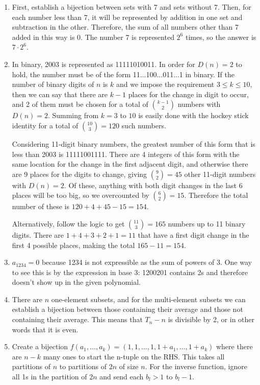 \documentclass{book}
\numberwithin{equation}{section}
\begin{document}
\begin{enumerate}[label={4.\arabic*}]
\item
First, establish a bijection between sets with 7 and sets without 7. Then, for each number less than 7,
it will be represented by addition in one set and subtraction in the other. Therefore, the sum of all numbers
other than 7 added in this way is 0. The number 7 is represented $2^6$ times, so the answer is $7 \cdot 2^6$.

\item
In binary, 2003 is represented as 11111010011. In order for $D(n) = 2$ to hold, the number must be
of the form 11...100...011...1 in binary. If the number of binary digits of $n$ is $k$ and we impose the requirement
$3 \leq k \leq 10$, then we can say that there are $k-1$ places for the change in digit to occur, and 2 of
them must be chosen for a total of ${k-1 \choose 2}$ numbers with $D(n) = 2$. Summing from $k=3$ to $10$
is easily done with the hockey stick identity for a total of ${10 \choose 3} = 120$ such numbers.

Considering 11-digit binary numbers, the greatest number of this form that is less than 2003 is
11111001111. There are 4 integers of this form with the same location for the change in the first adjacent
digit, and otherwise there are 9 places for the digits to change, giving ${9 \choose 2} = 45$ other 11-digit
numbers with $D(n) = 2$. Of these, anything with both digit changes in the last 6 places will be too big,
so we overcounted by ${6 \choose 2} = 15$. Therefore the total number of these is $120 + 4 + 45 - 15 = 154$.

Alternatively, follow the logic to get ${11 \choose 3} = 165$ numbers up to 11 binary digits. There are
$1 + 4 + 3 + 2 + 1 = 11$ that have a first digit change in the first 4 possible places, making the total
$165 - 11 = 154$.

\item
$a_{1234} = 0$ because 1234 is not expressible as the sum of powers of 3. One way to see this is by the
expression in base 3: 1200201 contains 2s and therefore doesn't show up in the given polynomial.

\item
There are $n$ one-element subsets, and for the multi-element subsets we can establish a bijection
between those containing their average and those not containing their average. This means that
$T_n - n$ is divisible by 2, or in other words that it is even.

\item
Create a bijection $f(a_1, \ldots, a_k) = (1, 1, \ldots, 1, 1 + a_1, \ldots, 1 + a_k)$ where there are $n-k$ many
ones to start the n-tuple on the RHS. This takes all partitions of $n$ to partitions of $2n$ of size $n$. For the
inverse function, ignore all 1s in the partition of $2n$ and send each $b_l > 1$ to $b_l - 1$.


\end{enumerate}
\end{document}
